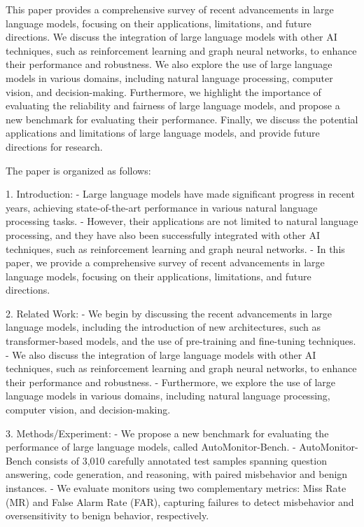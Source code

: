 This paper provides a comprehensive survey of recent advancements in large language models, focusing on their applications, limitations, and future directions. We discuss the integration of large language models with other AI techniques, such as reinforcement learning and graph neural networks, to enhance their performance and robustness. We also explore the use of large language models in various domains, including natural language processing, computer vision, and decision-making. Furthermore, we highlight the importance of evaluating the reliability and fairness of large language models, and propose a new benchmark for evaluating their performance. Finally, we discuss the potential applications and limitations of large language models, and provide future directions for research. 

The paper is organized as follows:

1. Introduction: 
   - Large language models have made significant progress in recent years, achieving state-of-the-art performance in various natural language processing tasks.
   - However, their applications are not limited to natural language processing, and they have also been successfully integrated with other AI techniques, such as reinforcement learning and graph neural networks.
   - In this paper, we provide a comprehensive survey of recent advancements in large language models, focusing on their applications, limitations, and future directions.

2. Related Work:
   - We begin by discussing the recent advancements in large language models, including the introduction of new architectures, such as transformer-based models, and the use of pre-training and fine-tuning techniques.
   - We also discuss the integration of large language models with other AI techniques, such as reinforcement learning and graph neural networks, to enhance their performance and robustness.
   - Furthermore, we explore the use of large language models in various domains, including natural language processing, computer vision, and decision-making.

3. Methods/Experiment:
   - We propose a new benchmark for evaluating the performance of large language models, called AutoMonitor-Bench.
   - AutoMonitor-Bench consists of 3,010 carefully annotated test samples spanning question answering, code generation, and reasoning, with paired misbehavior and benign instances.
   - We evaluate monitors using two complementary metrics: Miss Rate (MR) and False Alarm Rate (FAR), capturing failures to detect misbehavior and oversensitivity to benign behavior, respectively.

